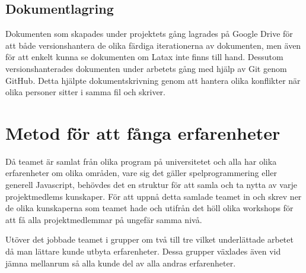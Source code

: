 \subsection{Dokumentlagring}
Dokumenten som skapades under projektets gång lagrades på Google Drive för att både versionshantera de olika färdiga iterationerna av dokumenten, men även för att enkelt kunna se dokumenten om Latax inte finns till hand. Dessutom versionshanterades dokumenten under arbetets gång med hjälp av Git genom GitHub. Detta hjälpte dokumentskrivning genom att hantera olika konflikter när olika personer sitter i samma fil och skriver.

\section{Metod för att fånga erfarenheter}
Då teamet är samlat från olika program på universitetet och alla har olika erfarenheter om olika områden, vare sig det gäller spelprogrammering eller generell Javascript, behövdes det en struktur för att samla och ta nytta av varje projektmedlems kunskaper. För att uppnå detta samlade teamet in och skrev ner de olika kunskaperna som teamet hade och utifrån det höll olika workshops för att få alla projektmedlemmar på ungefär samma nivå.

Utöver det jobbade teamet i grupper om två till tre vilket underlättade arbetet då man lättare kunde utbyta erfarenheter. Dessa grupper växlades även vid jämna mellanrum så alla kunde del av alla andras erfarenheter.



